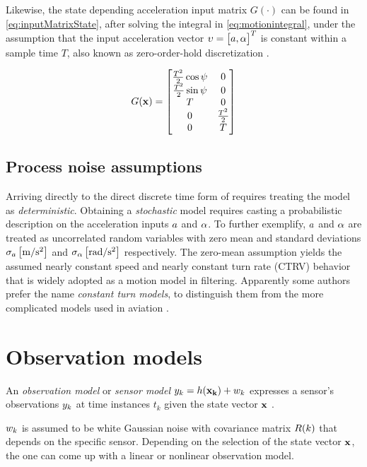 Likewise, the state depending acceleration input matrix $G(\cdot)$ can be found in \eqref{eq:inputMatrixState}, after solving the integral in \eqref{eq:motionintegral}, under the assumption that the input acceleration vector ${\upsilon} =\left[\begin{matrix}{a}, {\alpha}\end{matrix}\right]^T$ is constant within a sample time $T$, also known as zero-order-hold discretization \cite{6916122}.

\begin{equation}\label{eq:inputMatrixState}
G(\mathbf{x}) = \left[\begin{matrix}\frac{T^2}{2}\cos {\psi} &0\\ \frac{T^2}{2}\sin{\psi} &0 \\T &0\\0 &\frac{T^2}{2} \\0 &T\end{matrix}\right]
\end{equation}
\subsection{Process noise assumptions}
Arriving directly to the direct discrete time form of  requires treating the model as \emph{deterministic}. Obtaining a \emph{stochastic} model requires casting a probabilistic description on the acceleration inputs ${a}$ and ${\alpha}$. To further exemplify, ${a}$ and ${\alpha}$ are treated as uncorrelated random variables with zero mean and standard deviations $\sigma_{{a}} \left[\si{\meter\per\second^2}\right]$ and $\sigma_{{\alpha}} \left[\si{\radian\per\second^2}\right]$ respectively. The zero-mean assumption yields the assumed nearly constant speed and nearly constant turn rate (CTRV) behavior that is widely adopted as a motion model in filtering. Apparently some authors prefer the name \emph{constant turn models}, to distinguish them from the more complicated models used in aviation \cite{Li2003}.

\section{Observation models} \label{sec:ObservationModels}

An \emph{observation model} or \emph{sensor model} ${{y}}_k = h(\mathbf{x_k}) + {w}_k$ expresses a sensor's observations ${{y}}_k$ at time instances $t_k$ given the state vector $\mathbf{x}$ .

 ${w}_k$ is assumed to be white Gaussian noise with covariance matrix ${R}(k)$ that depends on the specific sensor. Depending on the selection of the state vector $\mathbf{x}$, the one can come up with a linear or nonlinear observation model.


